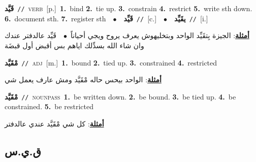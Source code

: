\documentclass[10pt,a4paper,twoside]{article} %
\begin{document}
\begin{multicols}{2}
{\setlength\topsep{0pt}\textbf{\foreignlanguage{arabic}{قَيَّد}}\ {\color{gray}\texttt{//}\color{black}}\ \textsc{verb}\ [p.]\ \textbf{1.}~bind  \textbf{2.}~tie up.  \textbf{3.}~constrain  \textbf{4.}~restrict  \textbf{5.}~write sth down.  \textbf{6.}~document sth.  \textbf{7.}~register sth\ \ $\bullet$\ \ \setlength\topsep{0pt}\textbf{\foreignlanguage{arabic}{قَيِّد}}\ {\color{gray}\texttt{//}\color{black}}\ [c.]\ \ $\bullet$\ \ \setlength\topsep{0pt}\textbf{\foreignlanguage{arabic}{يقَيِّد}}\ {\color{gray}\texttt{//}\color{black}}\ [i.]\  \begin{flushright}\color{gray}\foreignlanguage{arabic}{\textbf{\underline{\foreignlanguage{arabic}{أمثلة}}}: الجيزة بِتقَيِّد الواحد وبتخليهوش يعرف يروح ويجي أحياناً\ $\bullet$\ \  قَيِّد عالدفتر عندك وان شاء الله بسدِّلك اياهم بس أقبض أول قبضَة}\end{flushright}\color{black}} \vspace{2mm}

{\setlength\topsep{0pt}\textbf{\foreignlanguage{arabic}{مْقَيَّد}}\ {\color{gray}\texttt{//}\color{black}}\ \textsc{adj}\ [m.]\ \textbf{1.}~bound  \textbf{2.}~tied up.  \textbf{3.}~constrained  \textbf{4.}~restricted\  \begin{flushright}\color{gray}\foreignlanguage{arabic}{\textbf{\underline{\foreignlanguage{arabic}{أمثلة}}}: الواحد بيحس حاله مْقَيَّد ومش عارف يعمل شي}\end{flushright}\color{black}} \vspace{2mm}

{\setlength\topsep{0pt}\textbf{\foreignlanguage{arabic}{مْقَيَّد}}\ {\color{gray}\texttt{//}\color{black}}\ \textsc{noun\textunderscore pass}\ \textbf{1.}~be written down.  \textbf{2.}~be bound.  \textbf{3.}~be tied up.  \textbf{4.}~be constrained.  \textbf{5.}~be restricted\  \begin{flushright}\color{gray}\foreignlanguage{arabic}{\textbf{\underline{\foreignlanguage{arabic}{أمثلة}}}: كل شي مْقَيَّد عندي عالدفتر}\end{flushright}\color{black}} \vspace{2mm}

\vspace{-3mm}
\subsection*{\color{blue}\foreignlanguage{arabic}{ق.ي.س}\color{blue}{}} 


\end{multicols}
\end{document}

